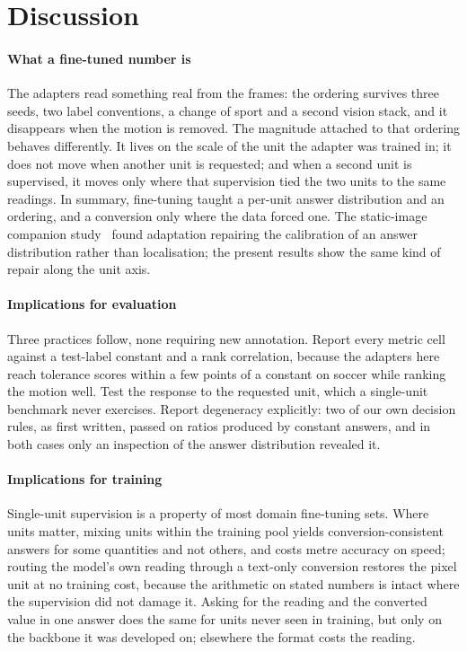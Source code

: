 \documentclass[preprint,number]{elsarticle}
\begin{document}
\section{Discussion}
\label{sec:discussion}

\paragraph{What a fine-tuned number is}
The adapters read something real from the frames: the ordering survives three
seeds, two label conventions, a change of sport and a second vision stack, and
it disappears when
the motion is removed. The magnitude attached to that ordering behaves
differently. It lives on the scale of the unit the adapter was trained in; it
does not move when another unit is requested; and when a second unit is
supervised, it moves only where that supervision tied the two units to the same
readings. In summary, fine-tuning taught a per-unit answer distribution and
an ordering, and a conversion only where the data forced one.
The static-image companion study~\cite{ji2026calibration} found adaptation
repairing the calibration of an answer distribution rather than localisation;
the present results show the same kind of repair along the unit axis.

\paragraph{Implications for evaluation}
Three practices follow, none requiring new annotation. Report every metric cell
against a test-label constant and a rank correlation, because the adapters here
reach tolerance scores within a few points of a constant on soccer while
ranking the motion well. Test the response to the requested unit, which a
single-unit benchmark never exercises. Report degeneracy explicitly: two of our
own decision rules, as first written, passed on ratios produced by constant
answers, and in both cases only an inspection of the answer distribution
revealed it.

\paragraph{Implications for training}
Single-unit supervision is a property of most domain fine-tuning sets. Where
units matter, mixing units within the training pool yields
conversion-consistent answers for some quantities and not others, and costs
metre accuracy on speed; routing the
model's own reading through a text-only conversion restores the pixel unit at no
training cost, because the arithmetic on stated numbers is intact where the
supervision did not damage it. Asking for the reading and the converted value
in one answer does the same for units never seen in training, but only on the
backbone it was developed on; elsewhere the format costs the reading.
\end{document}
